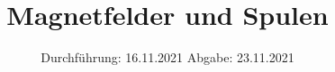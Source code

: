

\subject{V308}
\title{Magnetfelder und Spulen}
\date{%
  Durchführung: 16.11.2021
  \hspace{3em}
  Abgabe: 23.11.2021
}


\setlength{\parindent}{0pt} %

\maketitle
\thispagestyle{empty}
\tableofcontents
\newpage









\printbibliography{}


